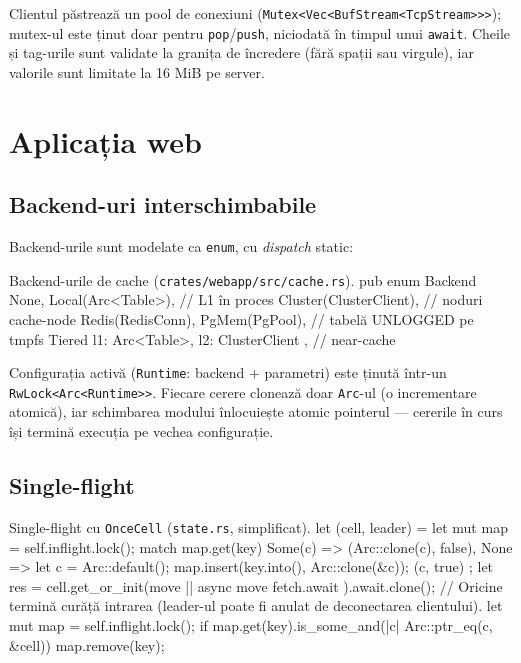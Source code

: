 Clientul păstrează un pool de conexiuni (\texttt{Mutex<Vec<BufStream<TcpStream>>>}); mutex-ul este
ținut doar pentru \texttt{pop}/\texttt{push}, niciodată în timpul unui \texttt{await}. Cheile și tag-urile
sunt validate la granița de încredere (fără spații sau virgule), iar valorile sunt limitate la 16 MiB pe
server.

\section{Aplicația web}

\subsection{Backend-uri interschimbabile}

Backend-urile sunt modelate ca \texttt{enum}, cu \emph{dispatch} static:

\begin{code}{Backend-urile de cache (\texttt{crates/webapp/src/cache.rs}).}
pub enum Backend {
    None,
    Local(Arc<Table>),                          // L1 în proces
    Cluster(ClusterClient),                     // noduri cache-node
    Redis(RedisConn),
    PgMem(PgPool),                              // tabelă UNLOGGED pe tmpfs
    Tiered { l1: Arc<Table>, l2: ClusterClient }, // near-cache
}
\end{code}

Configurația activă (\texttt{Runtime}: backend + parametri) este ținută într-un
\texttt{RwLock<Arc<Runtime>>}. Fiecare cerere clonează doar \texttt{Arc}-ul (o incrementare atomică), iar
schimbarea modului înlocuiește atomic pointerul — cererile în curs își termină execuția pe vechea
configurație.

\subsection{Single-flight}

\begin{code}{Single-flight cu \texttt{OnceCell} (\texttt{state.rs}, simplificat).}
let (cell, leader) = {
    let mut map = self.inflight.lock();
    match map.get(key) {
        Some(c) => (Arc::clone(c), false),
        None => { let c = Arc::default(); map.insert(key.into(), Arc::clone(&c)); (c, true) }
    }
};
let res = cell.get_or_init(move || async move { fetch.await }).await.clone();
// Oricine termină curăță intrarea (leader-ul poate fi anulat de deconectarea clientului).
let mut map = self.inflight.lock();
if map.get(key).is_some_and(|c| Arc::ptr_eq(c, &cell)) { map.remove(key); }
\end{code}

